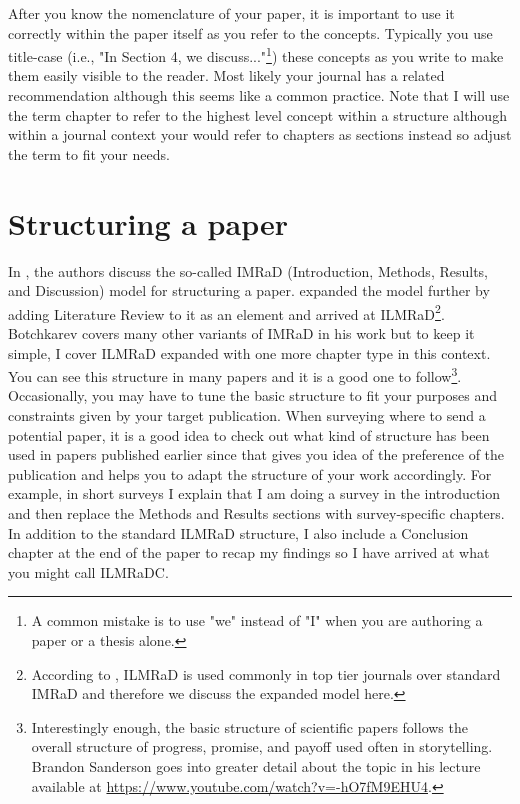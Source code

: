 After you know the nomenclature of your paper, it is important to use it correctly within the paper itself as you refer to the concepts.
Typically you use title-case (i.e., "In Section 4, we discuss..."\footnote{A common mistake is to use "we" instead of "I" when you are authoring a paper or a thesis alone.}) these concepts as you write to make them easily visible to the reader.
Most likely your journal has a related recommendation although this seems like a common practice.
Note that I will use the term chapter to refer to the highest level concept within a structure although within a journal context your would refer to chapters as sections instead so adjust the term to fit your needs.

\section{Structuring a paper}

In \citet{ecarnot2015writing}, the authors discuss the so-called IMRaD (Introduction, Methods, Results, and Discussion) model for structuring a paper.
\citet{botchkarev2025academic} expanded the model further by adding Literature Review to it as an element and arrived at ILMRaD\footnote{According to \citet{botchkarev2025academic}, ILMRaD is used commonly in top tier journals over standard IMRaD and therefore we discuss the expanded model here.}.
Botchkarev covers many other variants of IMRaD in his work but to keep it simple, I cover ILMRaD expanded with one more chapter type in this context.
You can see this structure in many papers and it is a good one to follow\footnote{Interestingly enough, the basic structure of scientific papers follows the overall structure of progress, promise, and payoff used often in storytelling. Brandon Sanderson goes into greater detail about the topic in his lecture available at \url{https://www.youtube.com/watch?v=-hO7fM9EHU4}.}.
Occasionally, you may have to tune the basic structure to fit your purposes and constraints given by your target publication.
When surveying where to send a potential paper, it is a good idea to check out what kind of structure has been used in papers published earlier since that gives you idea of the preference of the publication and helps you to adapt the structure of your work accordingly.
For example, in short surveys I explain that I am doing a survey in the introduction and then replace the Methods and Results sections with survey-specific chapters.
In addition to the standard ILMRaD structure, I also include a Conclusion chapter at the end of the paper to recap my findings so I have arrived at what you might call ILMRaDC.

